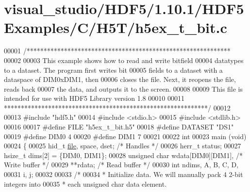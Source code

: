\hypertarget{visual__studio_2_h_d_f5_21_810_81_2_h_d_f5_examples_2_c_2_h5_t_2h5ex__t__bit_8c_source}{}\section{visual\+\_\+studio/\+H\+D\+F5/1.10.1/\+H\+D\+F5\+Examples/\+C/\+H5\+T/h5ex\+\_\+t\+\_\+bit.c}
\label{visual__studio_2_h_d_f5_21_810_81_2_h_d_f5_examples_2_c_2_h5_t_2h5ex__t__bit_8c_source}

\begin{DoxyCode}
00001 \textcolor{comment}{/************************************************************}
00002 \textcolor{comment}{}
00003 \textcolor{comment}{  This example shows how to read and write bitfield}
00004 \textcolor{comment}{  datatypes to a dataset.  The program first writes bit}
00005 \textcolor{comment}{  fields to a dataset with a dataspace of DIM0xDIM1, then}
00006 \textcolor{comment}{  closes the file.  Next, it reopens the file, reads back}
00007 \textcolor{comment}{  the data, and outputs it to the screen.}
00008 \textcolor{comment}{}
00009 \textcolor{comment}{  This file is intended for use with HDF5 Library version 1.8}
00010 \textcolor{comment}{}
00011 \textcolor{comment}{ ************************************************************/}
00012 
00013 \textcolor{preprocessor}{#include "hdf5.h"}
00014 \textcolor{preprocessor}{#include <stdio.h>}
00015 \textcolor{preprocessor}{#include <stdlib.h>}
00016 
00017 \textcolor{preprocessor}{#define FILE            "h5ex\_t\_bit.h5"}
00018 \textcolor{preprocessor}{#define DATASET         "DS1"}
00019 \textcolor{preprocessor}{#define DIM0            4}
00020 \textcolor{preprocessor}{#define DIM1            7}
00021 
00022 \textcolor{keywordtype}{int}
00023 main (\textcolor{keywordtype}{void})
00024 \{
00025     hid\_t           \hyperlink{structfile}{file}, space, dset;          \textcolor{comment}{/* Handles */}
00026     herr\_t          status;
00027     hsize\_t         dims[2] = \{DIM0, DIM1\};
00028     \textcolor{keywordtype}{unsigned} \textcolor{keywordtype}{char}   wdata[DIM0][DIM1],          \textcolor{comment}{/* Write buffer */}
00029                     **rdata;                    \textcolor{comment}{/* Read buffer */}
00030     \textcolor{keywordtype}{int}             ndims, A, B, C, D,
00031                     i, j;
00032 
00033     \textcolor{comment}{/*}
00034 \textcolor{comment}{     * Initialize data.  We will manually pack 4 2-bit integers into}
00035 \textcolor{comment}{     * each unsigned char data element.}

\end{DoxyCode}
